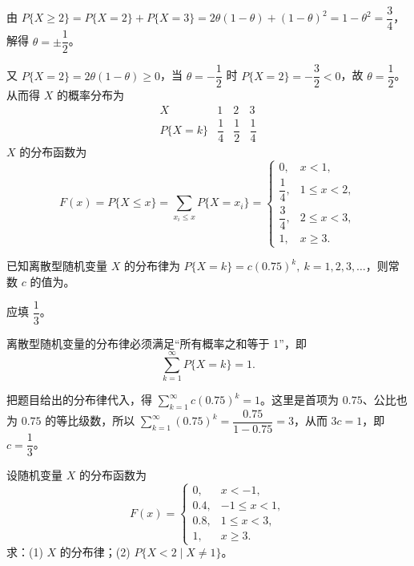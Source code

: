 ﻿\documentclass[lang=cn,11pt]{elegantbook}
\begin{document}
\begin{solution}
由 $P\{X \ge 2\} = P\{X=2\} + P\{X=3\} = 2\theta(1-\theta) + (1-\theta)^2 = 1 - \theta^2 = \dfrac{3}{4}$，解得 $\theta = \pm\dfrac{1}{2}$。

又 $P\{X=2\} = 2\theta(1-\theta) \ge 0$，当 $\theta = -\dfrac{1}{2}$ 时 $P\{X=2\} = -\dfrac{3}{2} < 0$，故 $\theta = \dfrac{1}{2}$。从而得 $X$ 的概率分布为
\[
\begin{array}{c|ccc}
X & 1 & 2 & 3 \\
\hline
P\{X=k\} & \dfrac{1}{4} & \dfrac{1}{2} & \dfrac{1}{4}
\end{array}
\]
$X$ 的分布函数为
\[
F(x) = P\{X \le x\} = \sum_{x_i \le x} P\{X = x_i\} = \begin{cases}
0, & x < 1, \\
\dfrac{1}{4}, & 1 \le x < 2, \\
\dfrac{3}{4}, & 2 \le x < 3, \\
1, & x \ge 3.
\end{cases}
\]
\end{solution}

\begin{exercise}\label{exer:2-25}
已知离散型随机变量 $X$ 的分布律为 $P\{X=k\} = c(0.75)^k,\ k=1,2,3,\dots$，则常数 $c$ 的值为\underline{\hspace{2cm}}。
\end{exercise}

\begin{solution}
应填 \(\dfrac{1}{3}\)。

离散型随机变量的分布律必须满足“所有概率之和等于 1”，即
\[
\sum_{k=1}^{\infty}P\{X=k\}=1.
\]

把题目给出的分布律代入，得 \(\sum_{k=1}^{\infty}c(0.75)^k=1\)。这里是首项为 \(0.75\)、公比也为 \(0.75\) 的等比级数，所以 \(\sum_{k=1}^{\infty}(0.75)^k=\dfrac{0.75}{1-0.75}=3\)，从而 \(3c=1\)，即 \(c=\dfrac13\)。
\end{solution}

\begin{exercise}\label{exer:2-26}
设随机变量 $X$ 的分布函数为
\[
F(x) = \begin{cases}
0, & x<-1, \\
0.4, & -1 \le x<1, \\
0.8, & 1 \le x<3, \\
1, & x \ge 3.
\end{cases}
\]
求：(1) $X$ 的分布律；(2) $P\{X<2 \mid X \neq 1\}$。
\end{exercise}
\end{document}
